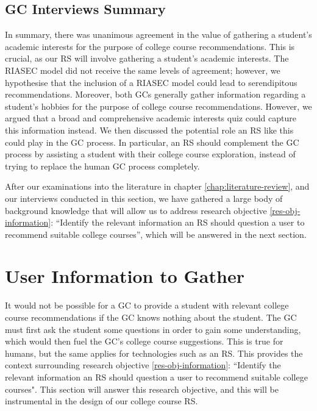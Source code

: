 \subsection{GC Interviews Summary}

In summary, there was unanimous agreement in the value of gathering a student's academic interests for the purpose of college course recommendations.
This is crucial, as our RS will involve gathering a student's academic interests.
The RIASEC model did not receive the same levels of agreement; however, we hypothesise that the inclusion of 
a RIASEC model could lead to serendipitous recommendations. 
Moreover, both GCs generally gather information regarding a student's hobbies for the purpose of college course recommendations.
However, we argued that a broad and comprehensive academic interests quiz could capture this information instead.
We then discussed the potential role an RS like this could play in the GC process.
In particular, an RS should complement the GC process by 
assisting a student with their college course exploration, 
instead of trying to replace the human GC process completely.

After our examinations into the literature in chapter \ref{chap:literature-review},
and our interviews conducted in this section, we have gathered a large body of background knowledge that will 
allow us to address research objective \ref{res-obj-information}: ``Identify the relevant information an RS should question a user to recommend suitable college courses'',
which will be answered in the next section.

\section{User Information to Gather}
\label{sec:user-information-to-profile}

It would not be possible for a GC to provide a student with relevant college course recommendations if the GC knows nothing about the student.
The GC must first ask the student some questions in order to gain some understanding, which would then fuel the GC's college course suggestions.
This is true for humans, but the same applies for technologies such as an RS.
This provides the context surrounding research objective \ref{res-obj-information}:
``Identify the relevant information an RS should question a user to recommend suitable college courses".
This section will answer this research objective, 
and this will be instrumental in the design of our college course RS.

